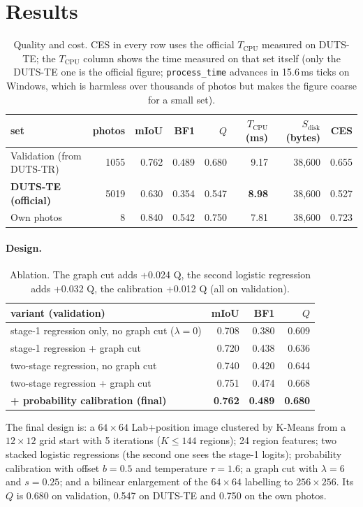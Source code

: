 \documentclass[11pt,a4paper]{article}
\begin{document}
\section{Results}
\begin{table}[h]\centering\small
\begin{tabular}{lrrrrrrr}\toprule
set & photos & mIoU & BF1 & $Q$ & $T_\mathrm{CPU}$ (ms) & $S_\mathrm{disk}$ (bytes) & CES \\\midrule
Validation (from DUTS-TR) & 1055 & 0.762 & 0.489 & 0.680 & 9.17 & 38,600 & 0.655 \\
\textbf{DUTS-TE (official)} & 5019 & 0.630 & 0.354 & 0.547 & \textbf{8.98} & 38,600 & 0.527 \\
Own photos & 8 & 0.840 & 0.542 & 0.750 & 7.81 & 38,600 & 0.723 \\
\bottomrule\end{tabular}
\caption{Quality and cost. CES in every row uses the official $T_\mathrm{CPU}$ measured on DUTS-TE; the $T_\mathrm{CPU}$ column shows the time measured on that set itself (only the DUTS-TE one is the official figure; \texttt{process\_time} advances in 15.6\,ms ticks on Windows, which is harmless over thousands of photos but makes the figure coarse for a small set).}\label{tab:res}\end{table}

\paragraph{Design.}
\begin{table}[h]\centering\small
\begin{tabular}{lrrr}\toprule variant (validation) & mIoU & BF1 & $Q$ \\\midrule
stage-1 regression only, no graph cut ($\lambda=0$) & 0.708 & 0.380 & 0.609 \\
stage-1 regression + graph cut & 0.720 & 0.438 & 0.636 \\
two-stage regression, no graph cut & 0.740 & 0.420 & 0.644 \\
two-stage regression + graph cut & 0.751 & 0.474 & 0.668 \\
\textbf{+ probability calibration (final)} & \textbf{0.762} & \textbf{0.489} & \textbf{0.680} \\
\bottomrule\end{tabular}
\caption{Ablation. The graph cut adds +0.024 Q, the second logistic regression adds +0.032 Q, the calibration +0.012 Q (all on validation).}\end{table}
The final design is: a $64{\times}64$ Lab+position image clustered by K-Means from a $12{\times}12$ grid start with 5 iterations ($K\le144$ regions); 24 region features;
two stacked logistic regressions (the second one sees the stage-1 logits); probability calibration with offset $b=0.5$ and temperature $\tau=1.6$; a graph cut with $\lambda=6$ and $s=0.25$;
and a bilinear enlargement of the $64{\times}64$ labelling to $256{\times}256$. Its $Q$ is 0.680 on validation, 0.547 on DUTS-TE and 0.750 on the own photos.
\end{document}
